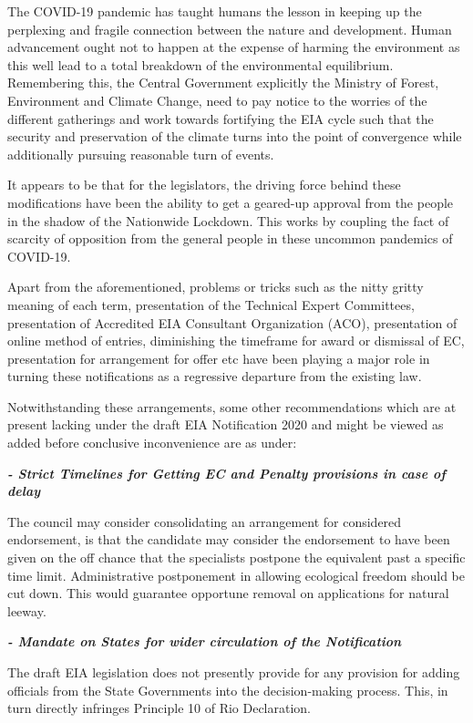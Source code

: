 \begin{multicols}{2}

\noi
The COVID-19 pandemic has taught humans the lesson in keeping up the perplexing and
fragile connection between the nature and development. Human advancement ought not to
happen at the expense of harming the environment as this well lead to a total breakdown of
the environmental equilibrium. Remembering this, the Central Government explicitly the
Ministry of Forest, Environment and Climate Change, need to pay notice to the worries of the
different gatherings and work towards fortifying the EIA cycle such that the security and
preservation of the climate turns into the point of convergence while additionally pursuing
reasonable turn of events.

\noi
It appears to be that for the legislators, the driving force behind these modifications have been
the ability to get a geared-up approval from the people in the shadow of the Nationwide
Lockdown. This works by coupling the fact of scarcity of opposition from the general people
in these uncommon pandemics of COVID-19.

\noi
Apart from the aforementioned, problems or tricks such as the nitty gritty meaning of each
term, presentation of the Technical Expert Committees, presentation of Accredited EIA
Consultant Organization (ACO), presentation of online method of entries, diminishing the
timeframe for award or dismissal of EC, presentation for arrangement for offer etc have been
playing a major role in turning these notifications as a regressive departure from the existing
law. 

\noi
Notwithstanding these arrangements, some other recommendations which are at present
lacking under the draft EIA Notification 2020 and might be viewed as added before
conclusive inconvenience are as under:

{\it\bfseries - Strict Timelines for Getting EC and Penalty provisions in case of delay}

\noi
The council may consider consolidating an arrangement for considered endorsement, is that
the candidate may consider the endorsement to have been given on the off chance that the
specialists postpone the equivalent past a specific time limit. Administrative postponement in
allowing ecological freedom should be cut down. This would guarantee opportune removal
on applications for natural leeway.

{\it\bfseries - Mandate on States for wider circulation of the Notification}

\noi
The draft EIA legislation does not presently provide for any provision for adding officials
from the State Governments into the decision-making process. This, in turn directly infringes
Principle 10 of Rio Declaration. 


\end{multicols}
